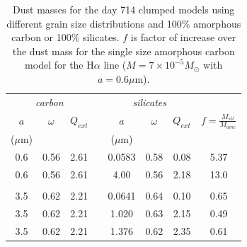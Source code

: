\documentclass[useAMS,usenatbib,usegraphicx]{mnras}
\begin{document}
\begin{table}
	\caption{Dust masses for the day 714 clumped models using different grain size distributions and 100\% amorphous carbon or 100\% silicates. $f$ is factor of increase over the dust mass for the single size amorphous carbon model for the H$\alpha$ line ($M = 7 \times 10^{-5} M_{\odot}$ with $a=0.6 \mu$m).}
	\label{tb_sil}
	\begin{center}
  	\begin{tabular}{@{} cccccccc @{}}
    	\hline
	\multicolumn{3}{c}{\textit{carbon}} && \multicolumn{3}{c}{\textit{silicates}} & \\
$a$ &$\omega$ &  $Q_{ext}$ & &$a$&$\omega$ & $Q_{ext}$ & $f=\frac{M_{sil}}{M_{amc}}$ \\
($\mu$m) &&&&($\mu$m)\\
\hline
0.6 & 0.56 & 2.61 & &0.0583 & 0.58 &0.08 & 5.37 \\
0.6 &0.56 & 2.61 & &4.00 & 0.56 & 2.18 & 13.0 \\
 \\
3.5 & 0.62 &2.21 & &0.0641 & 0.64 & 0.10 & 0.65 \\
3.5 & 0.62 &2.21 & &1.020 & 0.63 & 2.15 & 0.49 \\
3.5 & 0.62 & 2.21 & &1.376 & 0.62 & 2.35 & 0.61 \\


    \hline
  \end{tabular}
  \end{center}
\end{table}
\end{document}
